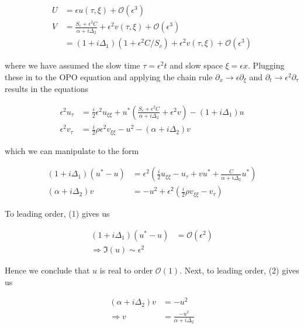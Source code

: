 \documentclass[12pt, a4paper]{article}
\begin{document}
\begin{enumerate}
\begin{enumerate}
        \begin{align*}
            U &= \epsilon u(\tau, \xi) +\mathcal O(\epsilon^3)\\ 
            V &= \frac{S_c + \epsilon^2 C}{\alpha + i\Delta_2} + \epsilon^2 v(\tau, \xi) + \mathcal O(\epsilon^3) \\&= (1+i \Delta_1)(1+\epsilon^2 C/S_c) + \epsilon^2 v(\tau, \xi) + \mathcal O(\epsilon^3)
        \end{align*}

        where we have assumed the slow time $\tau = \epsilon^2 t$ and slow space $\xi = \epsilon x$. Plugging these in to the OPO equation and applying the chain rule $\partial_x \rightarrow \epsilon \partial_\xi$ and $\partial_t \rightarrow \epsilon^2 \partial_\tau$ results in the equations 

        \begin{align*}
            \epsilon^2 u_\tau &= \frac{i}{2} \epsilon^2 u_{\xi\xi} + u^* \left( \frac{S_c + \epsilon^2 C}{\alpha + i\Delta_2} + \epsilon^2 v \right) - (1+ i\Delta_1) u \\
            \epsilon^2 v_\tau &= \frac{i}{2} \rho \epsilon^2 v_{\xi\xi} - u^2 - (\alpha + i\Delta_2) v 
        \end{align*}

        which we can manipulate to the form 

        \begin{align}
            (1+i \Delta_1)(u^*-u) &= \epsilon^2 \left(\frac{i}{2} u_{\xi\xi} - u_\tau + vu^* + \frac{C}{\alpha + i \Delta_2} u^* \right) \\
            (\alpha + i\Delta_2)v &= -u^2 + \epsilon^2 \left( \frac{i}{2} \rho v_{\xi\xi} - v_\tau \right)
        \end{align}

        To leading order, (1) gives us 

        \begin{align*}
            (1+i \Delta_1) (u^* - u) &= \mathcal O(\epsilon^2) \\
            \Rightarrow \Im(u) \sim \epsilon^2
        \end{align*}
        
        Hence we conclude that $u$ is real to order $\mathcal O(1)$. Next, to leading order, (2) gives us 

        \begin{align*}
            (\alpha + i\Delta_2) v &= - u^2 \\
            \Rightarrow v &= \frac{-u^2}{\alpha + i \Delta_2}
        \end{align*}


\end{enumerate}
\end{enumerate}
\end{document}
